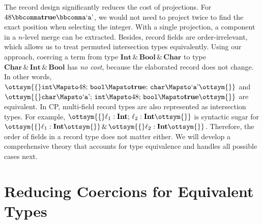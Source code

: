The record design significantly reduces the cost of projections. For
$48  \bbcomma   \mathbf{true}   \bbcomma   \text{`\texttt{a}'} $, we would not need to project twice to find the exact position
when selecting the integer. With a single projection, a component in a $n$-level
merge can be extracted. Besides, record fields are order-irrelevant, which
allows us to treat permuted intersection types equivalently. Using our approach,
coercing a term from type $ \mathbf{Int}   \, {\&} \,   \mathbf{Bool}   \, {\&} \,   \mathbf{Char} $ to type $ \mathbf{Char}   \, {\&} \,   \mathbf{Int}   \, {\&} \,   \mathbf{Bool} $ has
\emph{no cost}, because the elaborated record does not change. In other words,
$\ottsym{\{}   \mathtt{int}   \Mapsto  48  ; \,   \mathtt{bool}   \Mapsto   \mathbf{true}   ; \,   \mathtt{char}   \Mapsto   \text{`\texttt{a}'}   \ottsym{\}}$ and $\ottsym{\{}   \mathtt{char}   \Mapsto   \text{`\texttt{a}'}   ; \,   \mathtt{int}   \Mapsto  48  ; \,   \mathtt{bool}   \Mapsto   \mathbf{true}   \ottsym{\}}$ are equivalent. In CP, multi-field record types are also
represented as intersection types. For example, $\ottsym{\{}  \ell_{{\mathrm{1}}}  :   \mathbf{Int}   ; \,  \ell_{{\mathrm{2}}}  :   \mathbf{Int}   \ottsym{\}}$ is
syntactic sugar for $\ottsym{\{}  \ell_{{\mathrm{1}}}  :   \mathbf{Int}   \ottsym{\}}  \, {\&} \,  \ottsym{\{}  \ell_{{\mathrm{2}}}  :   \mathbf{Int}   \ottsym{\}}$. Therefore, the order of fields in a
record type does not matter either. We will develop a comprehensive theory that
accounts for type equivalence and handles all possible cases next.

\section{Reducing Coercions for Equivalent Types} \label{sec:eqty}

